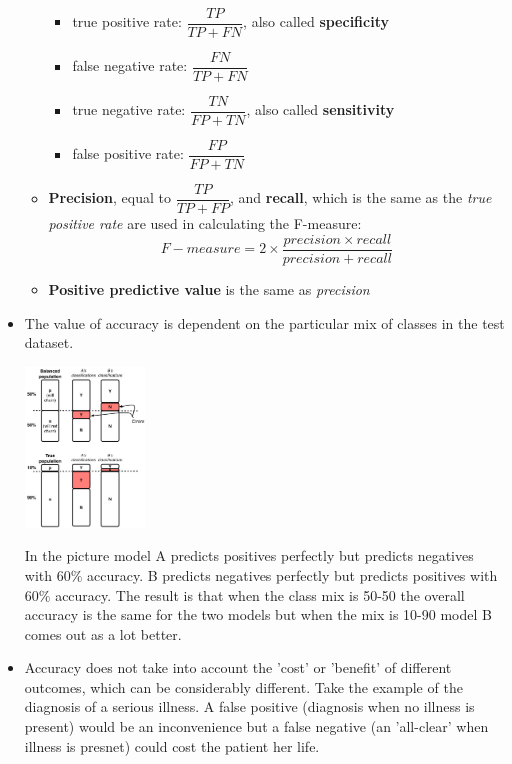 \begin{itemize}
\begin{itemize}
      \begin{itemize}
      \item true positive rate: $\dfrac{TP}{TP+FN}$, also called \textbf{specificity}
      \item false negative rate: $\dfrac{FN}{TP+FN}$
      \item true negative rate: $\dfrac{TN}{FP+TN}$, also called \textbf{sensitivity}
      \item false positive rate: $\dfrac{FP}{FP+TN}$
      \end{itemize}
      \twoex
    \item \textbf{Precision}, equal to $\dfrac{TP}{TP+FP}$, and \textbf{recall}, which is the same as the \emph{true positive rate} are used in calculating the F-measure:
      $$F-measure = 2\times \dfrac{precision \times recall}{precision + recall}$$
    \item \textbf{Positive predictive value} is the same as \emph{precision}
    \end{itemize}
    \newpage
  \item The value of accuracy is dependent on the particular mix of classes in the test dataset.
    
    \includegraphics[width=0.25\textwidth]{7-1_nocap.png}
    \hspace{0.02\textwidth}
    \parbox[b]{0.65\textwidth}{In the picture model A predicts positives perfectly but predicts negatives with $60\%$ accuracy. B predicts negatives perfectly but predicts positives with $60\%$ accuracy. The result is that when the class mix is 50-50 the overall accuracy is the same for the two models but when the mix is 10-90 model B comes out as a lot better.}

    \item Accuracy does not take into account the 'cost' or 'benefit' of different outcomes, which can be considerably different. Take the example of the diagnosis of a serious illness. A false positive (diagnosis when no illness is present) would be an inconvenience but a false negative (an 'all-clear' when illness is presnet) could cost the patient her life.
\end{itemize}


